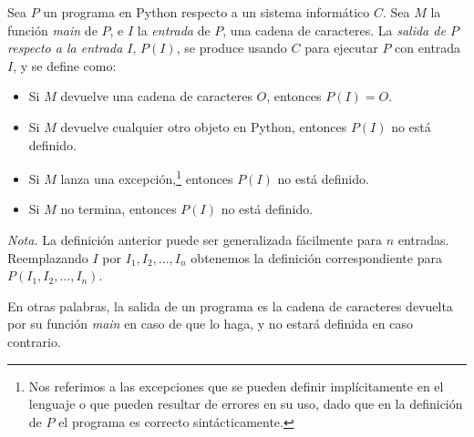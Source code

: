 \begin{definicion}\label{def:salida-programa}
Sea $P$ un programa en Python respecto a un sistema informático $C$. Sea $M$ la función \emph{main} de $P$, e $I$ la \emph{entrada} de $P$, una cadena de caracteres. La \emph{salida de $P$ respecto a la entrada $I$}, $P(I)$, se produce usando $C$ para ejecutar $P$ con entrada $I$, y se define como:

\begin{itemize}
    \item Si $M$ devuelve una cadena de caracteres $O$, entonces $P(I)=O$.
    \item Si $M$ devuelve cualquier otro objeto en Python, entonces $P(I)$ no está definido.
    \item Si $M$ lanza una excepción,\footnote{Nos referimos a las excepciones que se pueden definir implícitamente en el lenguaje o que pueden resultar de errores en su uso, dado que en la definición de $P$ el programa es correcto sintácticamente.} entonces $P(I)$ no está definido.
    \item Si $M$ no termina, entonces $P(I)$ no está definido.
\end{itemize}

\emph{Nota.} La definición anterior puede ser generalizada fácilmente para $n$ entradas. Reemplazando $I$ por $I_1, I_2, ..., I_n$ obtenemos la definición correspondiente para $P(I_1, I_2, ..., I_n)$.
\end{definicion}

En otras palabras, la salida de un programa es la cadena de caracteres devuelta por su función \emph{main} en caso de que lo haga, y no estará definida en caso contrario.

